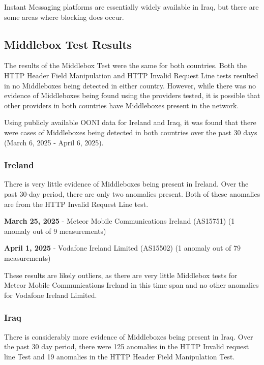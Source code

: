 Instant Messaging platforms are essentially widely available in Iraq, but there are some areas where blocking does occur.

\subsection{Middlebox Test Results}

The results of the Middlebox Test were the same for both countries. Both the HTTP Header Field Manipulation and HTTP Invalid Request Line tests resulted in no Middleboxes being detected in either country. However, while there was no evidence of Middleboxes being found using the providers tested, it is possible that other providers in both countries have Middleboxes present in the network.

Using publicly available OONI data for Ireland and Iraq, it was found that there were cases of Middleboxes being detected in both countries over the past 30 days (March 6, 2025 - April 6, 2025). 

\subsubsection{Ireland}

There is very little evidence of Middleboxes being present in Ireland. Over the past 30-day period, there are only two anomalies present. Both of these anomalies are from the HTTP Invalid Request Line test. 

\textbf{March 25, 2025} - Meteor Mobile Communications Ireland (AS15751) (1 anomaly out of 9 measurements)

\textbf{April 1, 2025} - Vodafone Ireland Limited (AS15502) (1 anomaly out of 79 measurements)

These results are likely outliers, as there are very little Middlebox tests for Meteor Mobile Communications Ireland in this time span and no other anomalies for Vodafone Ireland Limited.

\subsubsection{Iraq}

There is considerably more evidence of Middleboxes being present in Iraq. Over the past 30 day period, there were 125 anomalies in the HTTP Invalid request line Test and 19 anomalies in the HTTP Header Field Manipulation Test.

